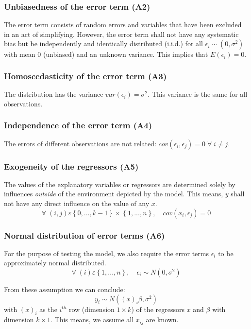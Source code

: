 	\subsubsection{Unbiasedness of the error term (A2)}		
		The error term consists of random errors and variables that have been excluded in an act of simplifying. However, the error term shall not have any systematic bias but be independently and identically distributed (i.i.d.) for all $\epsilon_i\sim(0,\sigma^2)$ with mean 0 (unbiased) and an unknown variance. This implies that $E(\epsilon_i)=0$.	
	\subsubsection{Homoscedasticity of the error term (A3)}		
		The distribution has the variance $var(\epsilon_i)=\sigma^2 $.	This variance is the same for all observations.
	\subsubsection{Independence of the error term (A4)}	
		The errors of different observations are not related: $cov(\epsilon_i,\epsilon_j)=0\;\forall\;i\neq j$.
	\subsubsection{Exogeneity of the regressors (A5)}
		The values of the explanatory variables or regressors are determined solely by influences \emph{outside} of the environment depicted by the model. This means, $y$ shall not have any direct influence on the value of any $x$.
		\begin{equation*}
			\forall\;(i,j)\varepsilon\left\{0,...,k-1\right\}\times\left\{1,...,n\right\},\quad cov(x_i,\epsilon_j)=0
		\end{equation*}
	\subsubsection{Normal distribution of error terms (A6)}\label{sec:ass6}
		For the purpose of testing the model, we also require the error terms $\epsilon_i$ to be approximately normal distributed.
		\begin{equation*}
			\forall\;(i)\varepsilon\left\{1,...,n\right\},\quad \epsilon_i\sim N(0,\sigma^2)
		\end{equation*}																	
	
	From these assumption we can conclude:
	\begin{equation*}
		y_i\sim N\left((x)_i\beta,\sigma^2\right)
	\end{equation*}
	with $(x)_i$ as the $i^{th}$ row (dimension $1\times k$) of the regressors $x$ and $\beta$ with  dimension $k\times 1$. This means, we assume all $x_{ij}$ are known.
